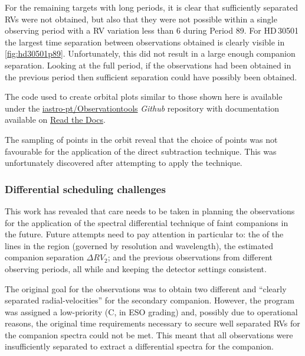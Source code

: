 For the remaining targets with long periods, it is clear that sufficiently separated {RV}s were not obtained, but also that they were not possible within a single observing period with a {RV} variation less than 6\kmps{} during {Period 89}.
For HD\,30501 the largest time separation between observations obtained is clearly visible in \cref{fig:hd30501p89}.
Unfortunately, this did not result in a large enough companion separation.
Looking at the full period, if the observations had been obtained in the previous period then sufficient separation could have possibly been obtained.

The code used to create orbital plots similar to those shown here is available under the \href{https://github.com/iastro-pt/ObservationTools}{iastro-pt/Observationtools} \emph{Github} repository with documentation available on \href{https://ia-observationtools.readthedocs.io/en/latest/rv.html}{Read the Docs}.


The sampling of points in the orbit reveal that the choice of points was not favourable for the application of the direct subtraction technique.
This was unfortunately discovered after attempting to apply the technique.





\subsubsection{Differential scheduling challenges}
\label{subsubsec:differential-schedualing}
This work has revealed that care needs to be taken in planning the observations for the application of the spectral differential technique of faint companions in the future.
Future attempts need to pay attention in particular to: the {\fwhm} of the lines in the region (governed by resolution and wavelength), the estimated companion separation \(\Delta {RV}_2\); and the previous observations from different observing periods, all while and keeping the detector settings consistent.

The original goal for the observations was to obtain two different and ``clearly separated radial-velocities'' for the secondary companion.
However, the program was assigned a low-priority (C, in {ESO} grading) and, possibly due to operational reasons, the original time requirements necessary to secure well separated {RV}s for the companion spectra could not be met.
This meant that all observations were insufficiently separated to extract a differential spectra for the companion.

